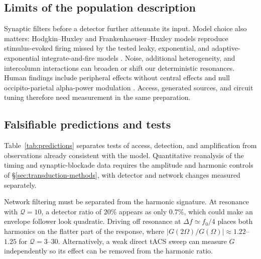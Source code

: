 \documentclass[11pt,a4paper]{article}
\begin{document}
\subsection{Limits of the population description}
Synaptic filters before a detector further attenuate its input. Model choice
also matters: Hodgkin--Huxley and Frankenhaeuser--Huxley models reproduce
stimulus-evoked firing missed by the tested leaky, exponential, and
adaptive-exponential integrate-and-fire models \cite{plovie2025}.
Noise, additional heterogeneity, and intercolumn interactions can broaden or
shift our deterministic resonances. Human findings include peripheral effects
without central effects \cite{iszak2023} and null occipito-parietal alpha-power
modulation \cite{mansourinezhad2025}. Access, generated sources, and circuit
tuning therefore need measurement in the same preparation.

\subsection{Falsifiable predictions and tests}\label{sec:predictions}
Table~\ref{tab:predictions} separates tests of access, detection, and amplification
from observations already consistent with the model. Quantitative reanalysis of
the timing and synaptic-blockade data requires the amplitude and harmonic controls
of \S\ref{sec:transduction-methods}, with detector and network changes measured
separately.

Network filtering must be separated from the harmonic signature. At resonance
with $\mathcal Q=10$, a detector ratio of $20\%$ appears as only $0.7\%$,
which could make an envelope follower look quadratic. Driving off resonance
at $\Delta f\simeq f_0/4$ places both harmonics on the flatter part of the
response, where $|G(2\Omega)/G(\Omega)|\approx1.22$--$1.25$ for
$\mathcal Q=3$--$30$. Alternatively, a weak direct tACS sweep can measure
$G$ independently so its effect can be removed from the harmonic ratio.
\end{document}
